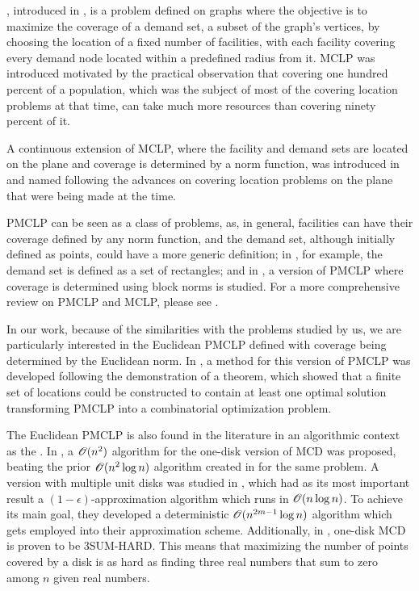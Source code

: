 , introduced in \cite{church:1974}, is 
a problem defined on graphs where the objective is to maximize the coverage of a demand set, a subset of the graph's vertices, by choosing the location of a fixed number of facilities, with each facility covering every demand node located within a predefined radius from it. 
MCLP was introduced motivated by the practical observation that covering one hundred percent of a population, which was the subject of most of the covering location problems at that time, can take much more resources than covering ninety percent of it.

A continuous extension of MCLP, where the facility and demand sets are located on the plane and coverage is determined by a norm function, was introduced in \cite{church:1984} and named  following the advances on covering location problems on the plane that were being made at the time.

{\color{Red}PMCLP can be seen as a class of problems, as, in general, facilities can have their coverage defined by any norm function, and the demand set, although initially defined as points, could have a more generic definition; in \cite{bansal}, for example, the demand set is defined as a set of rectangles; and in \cite{younies}, a version of PMCLP where coverage is determined using block norms is studied. For a more comprehensive review on PMCLP and MCLP, please see \cite{murray}.}

{\color{Red}In our work, because of the similarities with the problems studied by us, we are particularly interested in the Euclidean PMCLP defined with coverage being determined by the Euclidean norm. In \cite{church:1984}, a method for this version of PMCLP was developed following the demonstration of a theorem, which showed that a finite set of locations could be constructed to contain at least one optimal solution transforming PMCLP into a combinatorial optimization problem.} 

The Euclidean PMCLP is also found in the literature in an algorithmic context as the .
In , a $\mathscr{O}(n^2)$ algorithm for the one-disk version of MCD was proposed, beating the prior $\mathscr{O}(n^2\log{n})$ algorithm created in  for the same problem.
A version with multiple unit disks was studied in , which had as its most important result a $(1-\epsilon)$-approximation algorithm which runs in $\mathscr{O}(n\log{n})$. To achieve its main goal, they developed a deterministic $\mathscr{O}(n^{2m-1}\log{n})$ algorithm which gets employed into their approximation scheme.
Additionally, in , one-disk MCD is proven to be 3SUM-HARD. This means that maximizing the number of points covered by a disk is as hard as finding three real numbers that sum to zero among $n$ given real numbers.

